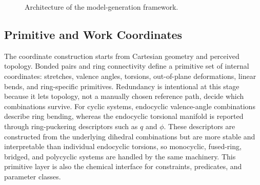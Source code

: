 \documentclass[aip,jcp,reprint,longbibliography,floatfix]{revtex4-2}
\begin{document}
\begin{figure}
{
}
\caption{Architecture of the model-generation framework.}
\label{fig:workflow-architecture}
\end{figure}


\subsection{Primitive and Work Coordinates}

The coordinate construction starts from Cartesian geometry and perceived
topology. Bonded pairs and ring connectivity define a primitive set of internal
coordinates:  stretches, valence angles, torsions, out-of-plane deformations,
linear bends, and ring-specific primitives. Redundancy is intentional at this
stage because it lets topology, not a manually chosen reference path, decide
which combinations survive. For cyclic systems, endocyclic valence-angle
combinations describe ring bending, whereas the endocyclic torsional manifold
is reported through ring-puckering descriptors such as $q$ and $\phi$. These
descriptors are constructed from the underlying dihedral combinations but are
more stable and interpretable than individual endocyclic torsions, so
monocyclic, fused-ring, bridged, and polycyclic systems are handled by the
same machinery.\cite{CremerPople1975} This
primitive layer is also the chemical interface for constraints, predicates,
and parameter classes.
\end{document}
